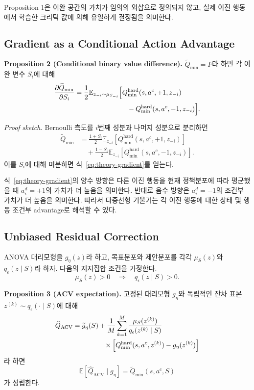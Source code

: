\documentclass[10pt,journal]{IEEEtran}
\newcommand{\E}{\mathbb{E}}
\begin{document}
Proposition 1은 이완 공간의 가치가 임의의 외삽으로 정의되지 않고, 실제 이진 행동에서 학습한 크리틱 값에 의해 유일하게 결정됨을 의미한다.


\subsection{Gradient as a Conditional Action Advantage}

\noindent\textbf{Proposition 2 (Conditional binary value difference).}
$\widetilde Q_{\min}=F$라 하면 각 이완 변수 $S_i$에 대해
\begin{align}
\frac{\partial \widetilde Q_{\min}}{\partial S_i}
&=
\frac{1}{2}
\E_{z_{-i}\sim\mu_{S_{-i}}}
\Big[
Q_{\min}^{\mathrm{hard}}(s,a^c,+1,z_{-i})
\nonumber\\
&\hspace{27mm}
-
Q_{\min}^{\mathrm{hard}}(s,a^c,-1,z_{-i})
\Big].
\label{eq:theory-gradient}
\end{align}

\noindent\emph{Proof sketch.}
Bernoulli 측도를 $i$번째 성분과 나머지 성분으로 분리하면
\begin{align}
\widetilde Q_{\min}
&=
\frac{1+S_i}{2}
\E_{z_{-i}}
[Q_{\min}^{\mathrm{hard}}(s,a^c,+1,z_{-i})]
\nonumber\\
&\quad+
\frac{1-S_i}{2}
\E_{z_{-i}}
[Q_{\min}^{\mathrm{hard}}(s,a^c,-1,z_{-i})].
\end{align}
이를 $S_i$에 대해 미분하면 식~\eqref{eq:theory-gradient}를 얻는다.

식~\eqref{eq:theory-gradient}의 양수 방향은 다른 이진 행동을 현재 정책분포에 따라 평균했을 때 $a_i^d=+1$의 가치가 더 높음을 의미한다. 반대로 음수 방향은 $a_i^d=-1$의 조건부 가치가 더 높음을 의미한다. 따라서 다중선형 기울기는 각 이진 행동에 대한 상태 및 행동 조건부 advantage로 해석할 수 있다.


\subsection{Unbiased Residual Correction}

ANOVA 대리모형을 $g_\eta(z)$라 하고, 목표분포와 제안분포를 각각 $\mu_S(z)$와 $q_\epsilon(z\mid S)$라 하자. 다음의 지지집합 조건을 가정한다.
\begin{equation}
\mu_S(z)>0
\quad\Longrightarrow\quad
q_\epsilon(z\mid S)>0.
\label{eq:support-condition}
\end{equation}

\noindent\textbf{Proposition 3 (ACV expectation).}
고정된 대리모형 $g_\eta$와 독립적인 잔차 표본
$z^{(k)}\sim q_\epsilon(\cdot\mid S)$에 대해
\begin{align}
\widehat Q_{\mathrm{ACV}}
&=
\widetilde g_\eta(S)
+
\frac{1}{M}\sum_{k=1}^{M}
\frac{\mu_S(z^{(k)})}
{q_\epsilon(z^{(k)}\mid S)}
\nonumber\\
&\hspace{16mm}\times
\left[
Q_{\min}^{\mathrm{hard}}(s,a^c,z^{(k)})
-
g_\eta(z^{(k)})
\right]
\end{align}
라 하면
\begin{equation}
\E[
\widehat Q_{\mathrm{ACV}}
\mid g_\eta
]
=
\widetilde Q_{\min}(s,a^c,S)
\label{eq:acv-expectation-theory}
\end{equation}
가 성립한다.
\end{document}
